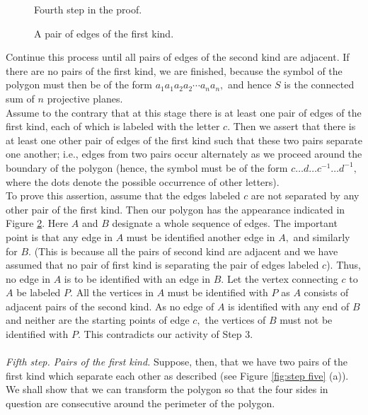\documentclass{article}
\theoremstyle{definition}
\begin{document}
\begin{figure}[!htb]
  \centering
  
  \caption{Fourth step in the proof.}
  \label{fig:step four}
\end{figure}
\begin{figure}[!htb]
  \centering
  
  \caption{A pair of edges of the first kind.}
  \label{fig:step four-2}
\end{figure}
Continue this process until all pairs of edges of the second kind are adjacent. If there are no pairs of the first kind, we are finished, because the symbol of the polygon must then be of the form $a_1a_1a_2a_2\cdots a_na_n,$ and hence $S$ is the connected sum of $n$ projective planes.\\
Assume to the contrary that at this stage there is at least one pair of edges of the first kind, each of which is labeled with the letter $c.$ Then we assert that there is at least one other pair of edges of the first kind such that these two pairs separate one another; i.e., edges from two pairs occur alternately as we proceed around the boundary of the polygon (hence, the symbol must be of the form $c\ldots d \ldots c^{-1} \ldots d^{-1},$ where the dots denote the possible occurrence of other letters).\\
To prove this assertion, assume that the edges labeled $c$ are not separated by any other pair of the first kind. Then our polygon has the appearance indicated in Figure \ref{fig:step four-2}. Here $A$ and $B$ designate a whole sequence of edges. The important point is that any edge in $A$ must be identified another edge in $A,$ and similarly for $B$. (This is because all the pairs of second kind are adjacent and we have assumed that no pair of first kind is separating the pair of edges labeled $c$). Thus, no edge in $A$ is to be identified with an edge in $B.$ Let the vertex connecting $c$ to $A$ be labeled $P.$ All the vertices in $A$ must be identified with $P$ as $A$ consists of adjacent pairs of the second kind. As no edge of $A$ is identified with any end of $B$ and neither are the starting points of edge $c,$ the vertices of $B$ must not be identified with $P.$ This contradicts our activity of Step 3.\\~\\
%
\emph{Fifth step. Pairs of the first kind.} Suppose, then, that we have two pairs of the first kind which separate each other as described (see Figure \ref{fig:step five} (a)). We shall show that we can transform the polygon so that the four sides in question are consecutive around the perimeter of the polygon.
\end{document}
